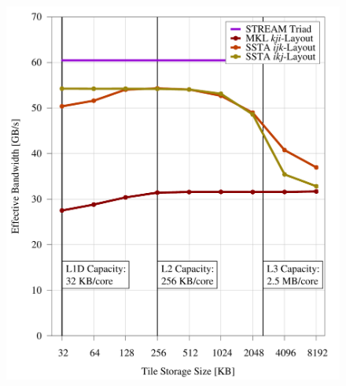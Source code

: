 \documentclass{sig-alternate-05-2015}
\begin{document}
\begin{figure}[!bth]
\begin{minipage}{0.49\textwidth}
{      
    }
    \label{fig:results:tile_size_hsw}
    \includegraphics[width=0.99\columnwidth]{figures/post_tsb_tw_sweep_full_matrix_double_precision_production_cori_hsw_e5_2698_v3_08_31_2016_09_03_2016_16pus.pdf}
  \end{minipage}
\end{figure}
\end{document}
